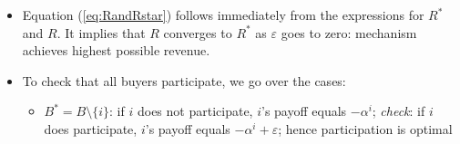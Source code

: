 \documentclass[11pt,english]{beamer}
\newcommand{\ve}{\varepsilon}
\newtheorem{proposition}{Proposition}
\begin{document}
\begin{frame}[allowframebreaks]
\begin{itemize}
\begin{itemize}
\item if $B^{*}=B$, then two cases (depending on comparison of $\sum_{i=1}^{n} \alpha^{i} $ and
  $ \pi_{i}+\alpha^i+\sum_{j \neq i} (\alpha^{j}-\alpha_{ij})$):
\label{sec-3-1-12-4}%
\begin{itemize}

\item $\max_{i} \pi_{i}-\sum_{j \neq i} \alpha_{ij}<0$: seller keeps the good, $i$ is required to pay $\alpha^{i}-\ve$ (threat: if $i$ does not pay, then $v(i)$ gets the good)
\label{sec-3-1-12-4-1}%
\begin{equation*}
R = \sum_{i} (\alpha^{i}-\ve)
\end{equation*}

\item $\max_{i} \pi_{i}-\sum_{j \neq i} \alpha_{ij}\geq 0$: seller sells to $k \in \arg\max_{i} \pi_{i}-\sum_{j \neq i} \alpha_{ij}$; $k$ pays $p=\pi_{k}+\alpha^{k}-\ve$; $j \neq k$ pays  $\alpha^{j}-\alpha_{kj} -\ve \geq 0$ (by definition of $\alpha^{j}$); threat if $j$ does not pay, good is sold to $v(j)$
\label{sec-3-1-12-4-2}%
\begin{equation*}
R = \sum_{i} (\alpha^{i}-\ve) + \pi_{k}-\sum_{i \neq k} \alpha_{ki}
\end{equation*}
\begin{proposition}
Everyone participates in the mechanism described above. Further,
\begin{equation}
\label{eq:RandRstar}
R^{*}\leq R+n\ve
\end{equation}
\end{proposition}

\end{itemize} %
\end{itemize} %

\newpage

\textbf{Proof}
\item Equation (\ref{eq:RandRstar}) follows immediately from the expressions for $R^{*}$ and $R$. It implies that $R$ converges to $R^{*}$ as $\ve$ goes to zero: mechanism achieves highest possible revenue.\\
\label{sec-3-1-13}%
\item To check that all buyers participate, we go over the cases:
\label{sec-3-1-14}%
\begin{itemize}

\item $B^{*}=B \setminus \{i\}$: if $i$ does not participate, $i$'s payoff equals $-\alpha^{i}$; \emph{check}: if $i$ does participate, $i$'s payoff equals $-\alpha^{i}+\ve$; hence participation is optimal\\
\label{sec-3-1-14-1}%
\end{itemize} %


\end{itemize}
\end{frame}
\end{document}
